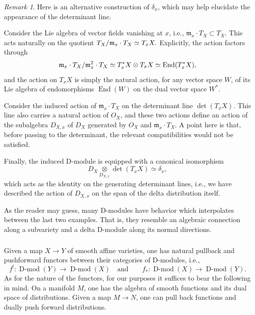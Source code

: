 \documentclass[10pt]{amsart}
\newcommand{\on}{\operatorname}
\newcommand{\Dmod}{\on{D-mod}}
\theoremstyle{remark}
\newtheorem{re}[subsubsection]{Remark}
\newcommand{\fm}{\mathfrak{m}}
\numberwithin{equation}{section}
\begin{document}
	
	\begin{re} \label{r:hwdelta}Here is an alternative construction of 
	$\delta_x$, which may 
	help elucidate the appearance of the determinant line. 
		
		Consider the Lie algebra of vector fields vanishing at $x$, i.e., $\fm_x \cdot T_X \subset T_X.$ This acts naturally on the quotient $T_X/ 
		\hspace{.1mm} \fm_x \cdot T_X \simeq T_x X.$ Explicitly, the action 
		factors through 
		\[
		\fm_x \cdot T_X / \hspace{.1mm} \fm_x^2 \cdot T_X \simeq T^*_x X 
		\otimes T_x X \simeq \on{End}(T^*_xX), 
		\]
		and the action on $T_x X$ is simply the natural action, 
		for any vector space $W$, of its Lie algebra of endomorphisms 
		$\on{End}(W)$ on the dual vector space $W^*$. 
		
		Consider the induced action of $\fm_x \cdot T_X$ on the determinant line $\det(T_xX)$. This line also  
		carries a natural action of $O_X$, and these two actions define 
		an action of the subalgebra $D_{X, x}$ of $D_X$ generated by $O_X$ and 
		$\fm_x \cdot T_X$. A point here is that, before passing to the 
		determinant, the relevant compatibilities would not be satisfied. 
		
		Finally, the induced D-module is equipped with a canonical isomorphism 
		\[
		D_X \underset{D_{X,x}} \otimes \det(T_xX) \simeq \delta_x,   
		\]
		which acts as the identity on the generating determinant lines, i.e., 
		we have described the action of $D_{X, x}$ on the span of the delta 
		distribution itself. \end{re}
	
	
	
	
	
	
	As the reader may guess, many D-modules have behavior which interpolates 
	between the last two examples. That is, they resemble an algebraic connection along a subvariety and a delta D-module along its normal directions. 

	
	
	\subsubsection{} \label{ss:pushpull}Given a map $X \rightarrow Y$ of smooth affine varieties, one has natural pullback and pushforward functors between their categories of D-modules, i.e., 
	\[
	  f^!: \Dmod(Y) \rightarrow \Dmod(X) \quad \text{and} \quad \quad f_*: \Dmod(X) \rightarrow \Dmod(Y).
	\]
	As for the nature of the functors, for our purposes it suffices to bear the following in mind. On a manifold $M$, one has the algebra of smooth functions and its dual space of distributions. Given a map $M \rightarrow N$, one can pull back functions and dually push forward distributions. 
	
\end{document}
